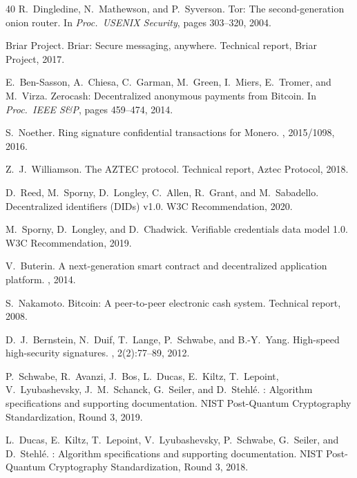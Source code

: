 \documentclass[11pt,a4paper]{article}
\begin{document}
\begin{thebibliography}{40}
R.~Dingledine, N.~Mathewson, and P.~Syverson.
\newblock Tor: The second-generation onion router.
\newblock In {\em Proc.\ USENIX Security}, pages 303--320, 2004.

Briar Project.
\newblock Briar: Secure messaging, anywhere.
\newblock Technical report, Briar Project, 2017.

E.~Ben-Sasson, A.~Chiesa, C.~Garman, M.~Green, I.~Miers, E.~Tromer, and M.~Virza.
\newblock Zerocash: Decentralized anonymous payments from {Bitcoin}.
\newblock In {\em Proc.\ IEEE S\&P}, pages 459--474, 2014.

S.~Noether.
\newblock Ring signature confidential transactions for {Monero}.
, 2015/1098, 2016.

Z.~J.~Williamson.
\newblock The {AZTEC} protocol.
\newblock Technical report, Aztec Protocol, 2018.

D.~Reed, M.~Sporny, D.~Longley, C.~Allen, R.~Grant, and M.~Sabadello.
\newblock Decentralized identifiers ({DIDs}) v1.0.
\newblock W3C Recommendation, 2020.

M.~Sporny, D.~Longley, and D.~Chadwick.
\newblock Verifiable credentials data model 1.0.
\newblock W3C Recommendation, 2019.

V.~Buterin.
\newblock A next-generation smart contract and decentralized application platform.
, 2014.

S.~Nakamoto.
\newblock Bitcoin: A peer-to-peer electronic cash system.
\newblock Technical report, 2008.

D.~J.~Bernstein, N.~Duif, T.~Lange, P.~Schwabe, and B.-Y.~Yang.
\newblock High-speed high-security signatures.
, 2(2):77--89, 2012.

P.~Schwabe, R.~Avanzi, J.~Bos, L.~Ducas, E.~Kiltz, T.~Lepoint, V.~Lyubashevsky, J.~M.~Schanck, G.~Seiler, and D.~Stehl\'{e}.
: Algorithm specifications and supporting documentation.
\newblock NIST Post-Quantum Cryptography Standardization, Round 3, 2019.

L.~Ducas, E.~Kiltz, T.~Lepoint, V.~Lyubashevsky, P.~Schwabe, G.~Seiler, and D.~Stehl\'{e}.
: Algorithm specifications and supporting documentation.
\newblock NIST Post-Quantum Cryptography Standardization, Round 3, 2018.


\end{thebibliography}
\end{document}
